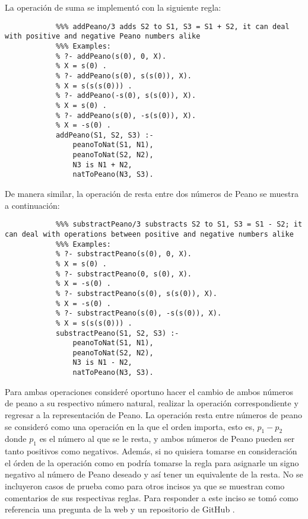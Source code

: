 \begin{enumerate}
\begin{solution}
        La operación de suma se implementó con la siguiente regla:
        \begin{verbatim}
            %%% addPeano/3 adds S2 to S1, S3 = S1 + S2, it can deal with positive and negative Peano numbers alike
            %%% Examples:
            % ?- addPeano(s(0), 0, X).
            % X = s(0) .
            % ?- addPeano(s(0), s(s(0)), X).
            % X = s(s(s(0))) .
            % ?- addPeano(-s(0), s(s(0)), X).
            % X = s(0) .
            % ?- addPeano(s(0), -s(s(0)), X).
            % X = -s(0) .
            addPeano(S1, S2, S3) :-
                peanoToNat(S1, N1),
                peanoToNat(S2, N2),
                N3 is N1 + N2,
                natToPeano(N3, S3).
        \end{verbatim}
        De manera similar, la operación de resta entre dos números de Peano se muestra a continuación:
        \begin{verbatim}
            %%% substractPeano/3 substracts S2 to S1, S3 = S1 - S2; it can deal with operations between positive and negative numbers alike
            %%% Examples:
            % ?- substractPeano(s(0), 0, X).
            % X = s(0) .
            % ?- substractPeano(0, s(0), X).
            % X = -s(0) .
            % ?- substractPeano(s(0), s(s(0)), X).
            % X = -s(0) .
            % ?- substractPeano(s(0), -s(s(0)), X).
            % X = s(s(s(0))) .
            substractPeano(S1, S2, S3) :-
                peanoToNat(S1, N1),
                peanoToNat(S2, N2),
                N3 is N1 - N2,
                natToPeano(N3, S3).
        \end{verbatim}
        Para ambas operaciones consideré oportuno hacer el cambio de ambos números de peano a su respectivo número natural, realizar la operación correspondiente y regresar a la representación de Peano. La operación resta entre números de peano se consideró como una operación en la que el orden importa, esto es, $p_1 - p_2$ donde $p_1$ es el número al que se le resta, y ambos números de Peano pueden ser tanto positivos como negativos. Además, si no quisiera tomarse en consideración el órden de la operación como en  podría tomarse la regla  para asignarle un signo negativo al número de Peano deseado y así tener un equivalente de la resta. No se incluyeron casos de prueba como para otros incisos ya que se muestran como comentarios de sus respectivas reglas. Para responder a este inciso se tomó como referencia una pregunta de la web \cite{stack2012peano} y un repositorio de GitHub \cite{git2016peano}.

\end{solution}
\end{enumerate}
